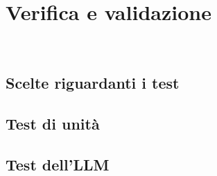 \chapter{Verifica e validazione}
\label{cap:verifica-validazione}

\\

\section{Scelte riguardanti i test}

\section{Test di unità}

\section{Test dell’LLM}
